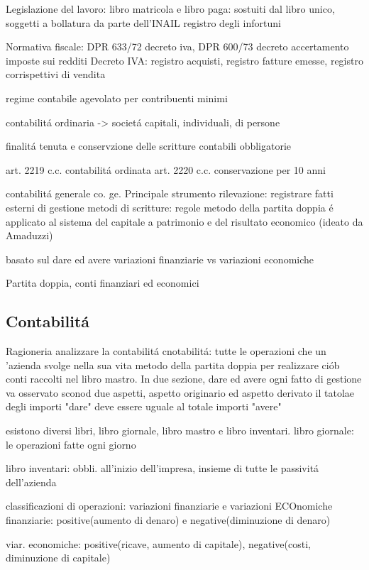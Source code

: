 \documentclass{article}
\begin{document}
Legislazione del lavoro: libro matricola e libro paga: sostuiti dal libro unico, soggetti a bollatura da parte dell'INAIL
registro degli infortuni

Normativa fiscale: 
DPR 633/72 decreto iva, DPR 600/73 decreto accertamento imposte sui redditi
Decreto IVA: registro acquisti, registro fatture emesse, registro corrispettivi di vendita

regime contabile agevolato per contribuenti minimi

contabilit\'a ordinaria -> societ\'a capitali, individuali, di persone

finalit\'a tenuta e conservzione delle scritture contabili obbligatorie

art. 2219 c.c. contabilit\'a ordinata
art. 2220 c.c. conservazione per 10 anni

contabilit\'a generale
co. ge.
Principale strumento rilevazione: registrare fatti esterni di gestione
metodi di scritture: regole
metodo della partita doppia \'e applicato al sistema del capitale a patrimonio e del risultato economico
(ideato da Amaduzzi)

basato sul dare ed avere
variazioni finanziarie vs variazioni economiche

Partita doppia, conti finanziari ed economici

\subsection{Contabilit\'a}
Ragioneria analizzare la contabilit\'a 
cnotabilit\'a: tutte le operazioni che un 'azienda svolge nella sua vita
metodo della partita doppia per realizzare ci\'ob
conti raccolti nel libro mastro. In due sezione, dare ed avere
ogni fatto di gestione va osservato sconod due aspetti, aspetto originario ed aspetto derivato
il tatolae degli importi "dare" deve essere uguale al totale importi "avere"

esistono diversi libri, libro giornale, libro mastro e libro inventari.
libro giornale: le operazioni fatte ogni giorno

libro inventari: obbli. all'inizio dell'impresa, insieme di tutte le passivit\'a dell'azienda

classificazioni di operazioni:
variazioni finanziarie e variazioni ECOnomiche
finanziarie: positive(aumento di denaro) e negative(diminuzione di denaro)

viar. economiche: positive(ricave, aumento di capitale), negative(costi, diminuzione di capitale)
\end{document}
